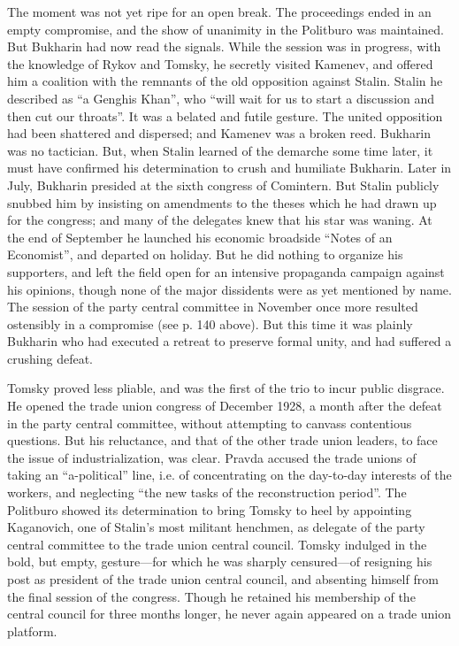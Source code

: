The moment was not yet ripe for an open break. The proceedings ended in an empty compromise, and the show of unanimity in the Politburo was maintained. But Bukharin had now read the signals. While the session was in progress, with the knowledge of Rykov and Tomsky, he secretly visited Kamenev, and offered him a coalition with the remnants of the old opposition against Stalin. Stalin he described as ``a Genghis Khan'', who ``will wait for us to start a discussion and then cut our throats''. It was a belated and futile gesture. The united opposition had been shattered and dispersed; and Kamenev was a broken reed. Bukharin was no tactician. But, when Stalin learned of the demarche some time later, it must have confirmed his determination to crush and humiliate Bukharin. Later in July, Bukharin presided at the sixth congress of Comintern. But Stalin publicly snubbed him by insisting on amendments to the theses which he had drawn up for the congress; and many of the delegates knew that his star was waning. At the end of September he launched his economic broadside ``Notes of an Economist'', and departed on holiday. But he did nothing to organize his supporters, and left the field open for an intensive propaganda campaign against his opinions, though none of the major dissidents were as yet mentioned by name. The session of the party central committee in November once more resulted ostensibly in a compromise (see p. 140 above). But this time it was plainly Bukharin who had executed a retreat to preserve formal unity, and had suffered a crushing defeat. 

Tomsky proved less pliable, and was the first of the trio to incur public disgrace. He opened the trade union congress of December 1928, a month after the defeat in the party central committee, without attempting to canvass contentious questions. But his reluctance, and that of the other trade union leaders, to face the issue of industrialization, was clear. Pravda accused the trade unions of taking an ``a-political'' line, i.e. of concentrating on the day-to-day interests of the workers, and neglecting ``the new tasks of the reconstruction period''. The Politburo showed its determination to bring Tomsky to heel by appointing Kaganovich, one of Stalin's most militant henchmen, as delegate of the party central committee to the trade union central council. Tomsky indulged in the bold, but empty, gesture---for which he was sharply censured---of resigning his post as president of the trade union central council, and absenting himself from the final session of the congress. Though he retained his membership of the central council for three months longer, he never again appeared on a trade union platform. 

